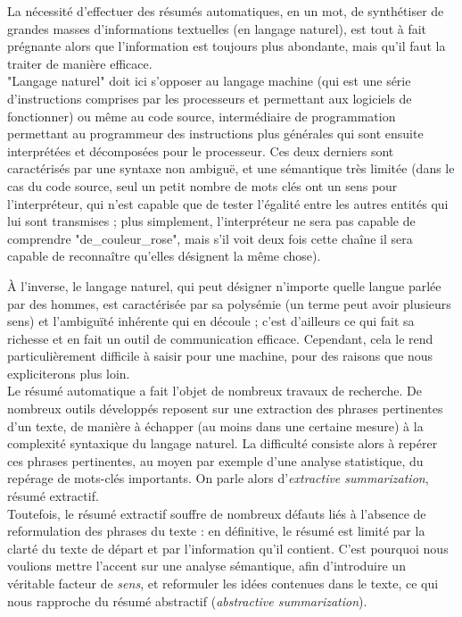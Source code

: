 \documentclass[a4paper, 12pt]{article}
\begin{document}
La nécessité d'effectuer des résumés automatiques, en un mot, de synthétiser de grandes masses d'informations textuelles (en langage naturel), est tout à fait prégnante alors que l'information est toujours plus abondante, mais qu'il faut la traiter de manière efficace.\\

"Langage naturel" doit ici s'opposer au langage machine (qui est une série d'instructions comprises par les processeurs et permettant aux logiciels de fonctionner) ou même au code source, intermédiaire de programmation permettant au programmeur des instructions plus générales qui sont ensuite interprétées et décomposées pour le processeur. Ces deux derniers sont caractérisés par une syntaxe non ambiguë, et une sémantique très limitée (dans le cas du code source, seul un petit nombre de mots clés ont un sens pour l'interpréteur, qui n'est capable que de tester l'égalité entre les autres entités qui lui sont transmises ; plus simplement, l'interpréteur ne sera pas capable de comprendre "de\_couleur\_rose", mais s'il voit deux fois cette chaîne il sera capable de reconnaître qu'elles désignent la même chose).

À l'inverse, le langage naturel, qui peut désigner n'importe quelle langue parlée par des hommes, est caractérisée par sa polysémie (un terme peut avoir plusieurs sens) et l'ambiguïté inhérente qui en découle ; c'est d'ailleurs ce qui fait sa richesse et en fait un outil de communication efficace. Cependant, cela le rend particulièrement difficile à saisir pour une machine, pour des raisons que nous expliciterons plus loin.\\

Le résumé automatique a fait l'objet de nombreux travaux de recherche. De nombreux outils développés reposent sur une extraction des phrases pertinentes d'un texte, de manière à échapper (au moins dans une certaine mesure) à la complexité syntaxique du langage naturel. La difficulté consiste alors à repérer ces phrases pertinentes, au moyen par exemple d'une analyse statistique, du repérage de mots-clés importants. On parle alors d'\textit{extractive summarization}, résumé extractif.\\

Toutefois, le résumé extractif souffre de nombreux défauts liés à l'absence de reformulation des phrases du texte : en définitive, le résumé est limité par la clarté du texte de départ et par l'information qu'il contient. C'est pourquoi nous voulions mettre l'accent sur une analyse sémantique, afin d'introduire un véritable facteur de \textit{sens}, et reformuler les idées contenues dans le texte, ce qui nous rapproche du résumé abstractif (\textit{abstractive summarization}).\\
\end{document}
